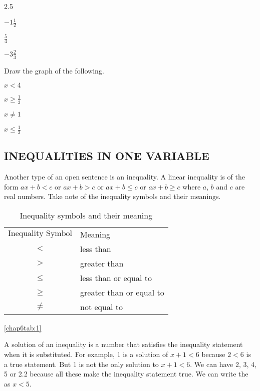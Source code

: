 \begin{inparaenum}
\item 2.5 \hfil \item $-1\frac{1}{2}$ \hfil \item $\frac{5}{4}$ \hfil \item $-3\frac{2}{3}$
\end{inparaenum}

Draw the graph of the following.

\begin{inparaenum}
\item $x<4$ \hfil \item $x\ge\frac{1}{2}$ \hfil \item $x\neq 1$ \hfil \item $x\le \frac{1}{3}$
\end{inparaenum}

\subsection*{INEQUALITIES IN ONE VARIABLE}
Another type of an open sentence is an inequality. A linear inequality is of the form $ax + b < c$ or
$ax + b > c$ or $ax + b\le c$ or $ax + b \ge c$ where $a$, $b$ and $c$ are real numbers. Take note of the inequality symbols and their meanings.

\begin{table}[!h]
\centering
\caption{Inequality symbols and their meaning}
\begin{tabular}{>{$}c<{$}l}
\hline \hline
\text{Inequality Symbol} & Meaning\\
< & less than\\
> & greater than\\
\le & less than or equal to\\
\ge & greater than or equal to\\
\neq & not equal to\\
\hline 
\end{tabular}
\label{chap6tab:1}\eqref{chap6tab:1}
\end{table}

A solution of an inequality is a number that satisfies the inequality statement when it is substituted. For example, 1 is a solution of $x + 1 < 6$ because $2 < 6$ is a true statement. But 1 is not the only solution to $x + 1 < 6$. We can have 2, 3, 4, 5 or 2.2 because all these make the
inequality statement true. We can write the  as $x < 5$.

